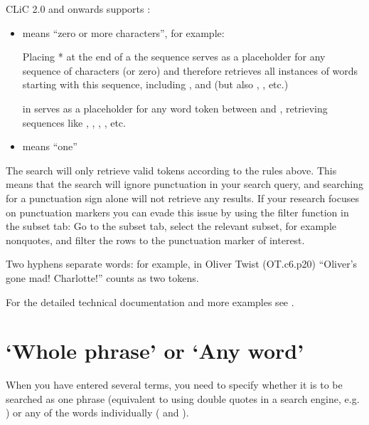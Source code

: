 \documentclass[letterpaper,10pt,english]{sphinxmanual}
\begin{document}
\sphinxAtStartPar
CLiC 2.0 and onwards supports :
\begin{itemize}
\item {} 
\sphinxAtStartPar
\sphinxcode{\sphinxupquote{*}} means “zero or more characters”, for example:

\sphinxAtStartPar
Placing * at the end of a the sequence  serves as a placeholder for
any sequence of characters (or zero) and therefore retrieves all instances of
words starting with this sequence, including ,  and 
(but also , ,  etc.)

\sphinxAtStartPar
\sphinxcode{\sphinxupquote{*}} in  serves as a placeholder for any word token
between  and , retrieving sequences like ,
, , ,
 etc.

\item {} 
\sphinxAtStartPar
{} means “one”

\end{itemize}

\sphinxAtStartPar
The search will only retrieve valid tokens according to the rules above.
This means that the search will ignore punctuation in your search query,
and searching for a punctuation sign alone will not retrieve any results.
If your research focuses on punctuation markers you can evade this issue
by using the filter function in the subset tab: Go to the subset tab,
select the relevant subset, for example non\sphinxhyphen{}quotes, and filter the rows
to the punctuation marker of interest.

\sphinxAtStartPar
Two hyphens separate words: for example,  in Oliver
Twist (OT.c6.p20) “Oliver’s gone mad! Char\textendash{}lotte!” counts as two
tokens.

\sphinxAtStartPar
For the detailed technical documentation and more examples see .


\section{‘Whole phrase’ or ‘Any word’}
\label{\detokenize{clicanalysis/concordance:whole-phrase-or-any-word}}
\sphinxAtStartPar
When you have entered several terms, you need to specify whether it is
to be searched as one phrase (equivalent to using double quotes in a
search engine, e.g. ) or any of the words individually
( and ).
\end{document}
